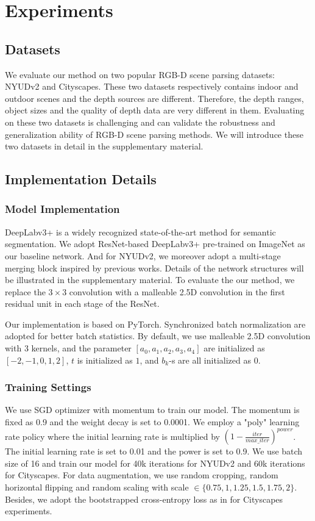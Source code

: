 \documentclass[runningheads]{llncs}
\begin{document}
\section{Experiments}
\subsection{Datasets}
We evaluate our method on two popular RGB-D scene parsing datasets: NYUDv2\cite{NYUDv2} and Cityscapes\cite{Cityscapes}.
These two datasets respectively contains indoor and outdoor scenes and the depth sources are different.
Therefore, the depth ranges, object sizes and the quality of depth data are very different in them.
Evaluating on these two datasets is challenging and can validate the robustness and generalization ability of RGB-D scene parsing methods.
We will introduce these two datasets in detail in the supplementary material.



\subsection{Implementation Details}
\subsubsection{Model Implementation}
DeepLabv3+\cite{DeepLabv3plus} is a widely recognized state-of-the-art method for semantic segmentation.
We adopt ResNet-based DeepLabv3+ pre-trained on ImageNet\cite{ImageNet} as our baseline network.
And for NYUDv2, we moreover adopt a multi-stage merging block inspired by previous works\cite{RefineNet,RDFNet}.
Details of the network structures will be illustrated in the supplementary material.
To evaluate the our method, we replace the $3\times3$ convolution with a malleable 2.5D convolution in the first residual unit in each stage of the ResNet.

Our implementation is based on PyTorch\cite{PyTorch}.
Synchronized batch normalization are adopted for better batch statistics.
By default, we use malleable 2.5D convolution with 3 kernels, and the parameter $[a_0, a_1, a_2, a_3, a_4]$ are initialized as $[-2,-1,0,1,2]$, $t$ is initialized as $1$, and $b_k$-s are all initialized as $0$.

\subsubsection{Training Settings}
We use SGD optimizer with momentum to train our model. The momentum is fixed as 0.9 and the weight decay is set to 0.0001. We employ a "poly" learning rate policy where the initial learning rate is multiplied by $(1-\frac{iter}{max\_iter})^{power}$. The initial learning rate is set to 0.01 and the power is set to 0.9.
We use batch size of 16 and train our model for 40k iterations for NYUDv2 and 60k iterations for Cityscapes.
For data augmentation, we use random cropping, random horizontal flipping and random scaling with scale $\in\{0.75,1,1.25,1.5,1.75,2\}$.
Besides, we adopt the bootstrapped cross-entropy loss as in \cite{arxiv2016-WuSH16a} for Cityscapes experiments.
\end{document}
